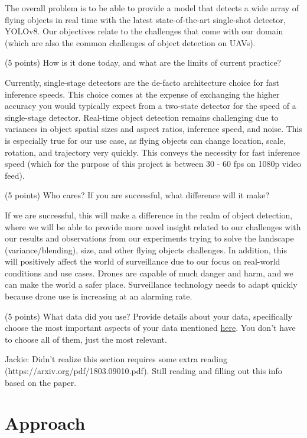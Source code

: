 \documentclass[10pt,twocolumn,letterpaper]{article}
\begin{document}
The overall problem is to be able to provide a model that detects a wide array of flying objects in real time with the latest state-of-the-art single-shot detector, YOLOv8. Our objectives relate to the challenges that come with our domain (which are also the common challenges of object detection on UAVs).


(5 points) How is it done today, and what are the limits of current practice?

Currently, single-stage detectors are the de-facto architecture choice for fast inference speeds. This choice comes at the expense of exchanging the higher accuracy you would typically expect from a two-state detector for the speed of a single-stage detector. Real-time object detection remains challenging due to variances in object spatial sizes and aspect ratios, inference speed, and noise. This is especially true for our use case, as flying objects can change location, scale, rotation, and trajectory very quickly. This conveys the necessity for fast inference speed (which for the purpose of this project is between 30 - 60 fps on 1080p video feed). 

(5 points) Who cares? If you are successful, what difference will it make? 

If we are successful, this will make a difference in the realm of object detection, where we will be able to provide more novel insight related to our challenges with our results and observations from our experiments trying to solve the landscape (variance/blending), size, and other flying objects challenges. In addition, this will positively affect the world of surveillance due to our focus on real-world conditions and use cases. Drones are capable of much danger and harm, and we can make the world a safer place. Surveillance technology needs to adapt quickly because drone use is increasing at an alarming rate.

(5 points) What data did you use? Provide details about your data, specifically choose the most important aspects of your data mentioned \href{https://arxiv.org/abs/1803.09010}{here}. You don’t have to choose all of them, just the most relevant.

Jackie: Didn't realize this section requires some extra reading (https://arxiv.org/pdf/1803.09010.pdf). Still reading and filling out this info based on the paper.
\section{Approach}
\end{document}
